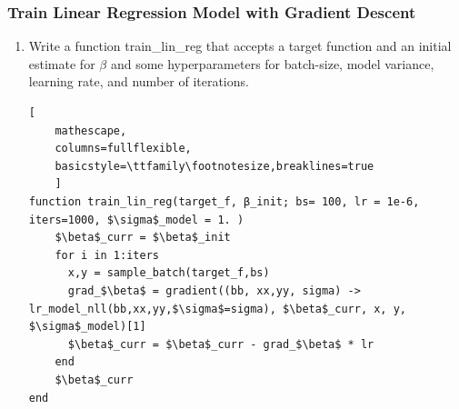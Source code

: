 \documentclass[12pt,letter]{article}
\begin{document}
\pagebreak

\subsubsection{Train Linear Regression Model with Gradient Descent}

\begin{enumerate}
\item Write a function train\_lin\_reg that accepts a target function and an initial
estimate for $\beta$ and some hyperparameters for batch-size, model variance, learning rate,
and number of iterations.
\begin{lstlisting}[
    mathescape,
    columns=fullflexible,
    basicstyle=\ttfamily\footnotesize,breaklines=true
    ]
function train_lin_reg(target_f, β_init; bs= 100, lr = 1e-6, iters=1000, $\sigma$_model = 1. )
    $\beta$_curr = $\beta$_init
    for i in 1:iters
      x,y = sample_batch(target_f,bs)
      grad_$\beta$ = gradient((bb, xx,yy, sigma) -> lr_model_nll(bb,xx,yy,$\sigma$=sigma), $\beta$_curr, x, y, $\sigma$_model)[1]
      $\beta$_curr = $\beta$_curr - grad_$\beta$ * lr
    end
    $\beta$_curr
end
\end{lstlisting}


\end{enumerate}
\end{document}

